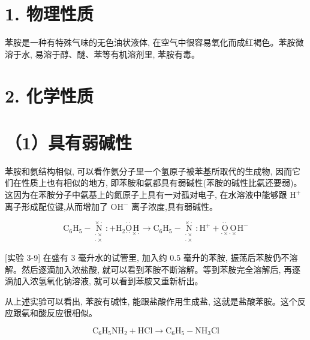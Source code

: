 \documentclass[10pt]{article}
\begin{document}
\section*{1. 物理性质}

苯胺是一种有特殊气味的无色油状液体, 在空气中很容易氧化而成红褐色。苯胺微溶于水, 易溶于醇、醚、苯等有机溶剂里, 苯胺有毒。

\section*{2. 化学性质}

\section*{（1）具有弱碱性}

苯胺和氨结构相似, 可以看作氨分子里一个氢原子被苯基所取代的生成物, 因而它们在性质上也有相似的地方, 即苯胺和氨都具有弱碱性(苯胺的碱性比氨还要弱)。这因为在苯胺分子中氨基上的氮原子上具有一对孤对电子, 在水溶液中能够跟 \({\mathrm{H}}^{ + }\) 离子形成配位键,从而增加了 \({\mathrm{{OH}}}^{ - }\) 离子浓度,具有弱碱性。

\[
{\mathrm{C}}_{6}{\mathrm{H}}_{5} - \underset{\begin{matrix} {\cdot \times } \\ {\cdot \times } \end{matrix}}{\overset{\times \cdot }{\mathrm{N}}} : + {\mathrm{H}}_{2}\underset{\cdot \cdot }{\overset{\cdot \cdot }{\mathrm{O}}}\underset{\times \cdot }{\mathrm{H}} \rightarrow {\mathrm{C}}_{6}{\mathrm{H}}_{5} - \underset{\begin{matrix} {\cdot \times } \\ {\cdot \times } \end{matrix}}{\overset{\times \cdot }{\mathrm{N}}} : {\mathrm{H}}^{ + } + \underset{\cdot \times }{\overset{\cdot \cdot }{\mathrm{O}}}\underset{\cdot \times }{\mathrm{O}}{\mathrm{H}}^{ - }
\]

[实验 3-9] 在盛有 3 毫升水的试管里, 加入约 0.5 毫升的苯胺, 振荡后苯胺仍不溶解。然后逐滴加入浓盐酸, 就可以看到苯胺不断溶解。等到苯胺完全溶解后, 再逐滴加入浓氢氧化钠溶液, 就可以看到苯胺又重新析出。

从上述实验可以看出, 苯胺有碱性, 能跟盐酸作用生成盐, 这就是盐酸苯胺。这个反应跟氨和酸反应很相似。

\[
{\mathrm{C}}_{6}{\mathrm{H}}_{5}{\mathrm{{NH}}}_{2} + \mathrm{{HCl}} \rightarrow {\mathrm{C}}_{6}{\mathrm{H}}_{5} - {\mathrm{{NH}}}_{3}\mathrm{{Cl}}
\]
\end{document}
